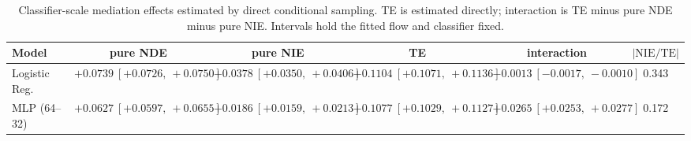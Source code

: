 \begin{table}[htbp]
  \centering
  \caption{Classifier-scale mediation effects estimated by direct conditional sampling. TE is estimated directly; interaction is TE minus pure NDE minus pure NIE. Intervals hold the fitted flow and classifier fixed.}
  \label{tab:acs_gap_overall}
  \begin{tabular}{lccccc}
    \toprule
    Model & pure NDE & pure NIE & TE & interaction & $|\mathrm{NIE}/\mathrm{TE}|$ \\
    \midrule
    Logistic Reg. & $+0.0739\ [+0.0726,\ +0.0750]$ & $+0.0378\ [+0.0350,\ +0.0406]$ & $+0.1104\ [+0.1071,\ +0.1136]$ & $-0.0013\ [-0.0017,\ -0.0010]$ & 0.343 \\
    MLP (64--32) & $+0.0627\ [+0.0597,\ +0.0655]$ & $+0.0186\ [+0.0159,\ +0.0213]$ & $+0.1077\ [+0.1029,\ +0.1127]$ & $+0.0265\ [+0.0253,\ +0.0277]$ & 0.172 \\
    \bottomrule
  \end{tabular}
\end{table}